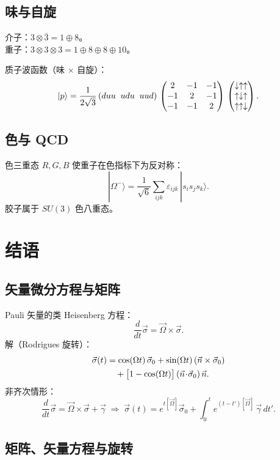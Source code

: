 \subsection{味与自旋}

介子：$3\otimes\bar{3} = 1\oplus 8$。\\
重子：$3\otimes 3\otimes 3 = 1\oplus 8\oplus 8\oplus 10$。

质子波函数（味 $\times$ 自旋）：
\[
|p\rangle = \frac{1}{2\sqrt{3}}\,
(duu\;\;udu\;\;uud)\,
\begin{pmatrix}2&-1&-1\\-1&2&-1\\-1&-1&2\end{pmatrix}\,
\begin{pmatrix}\downarrow\uparrow\uparrow \\ \uparrow\downarrow\uparrow \\ \uparrow\uparrow\downarrow\end{pmatrix}.
\]

\subsection{色与 QCD}

色三重态 $R,G,B$ 使重子在色指标下为反对称：
\[
|\Omega^{-}\rangle = \frac{1}{\sqrt{6}}\sum_{ijk}\varepsilon_{ijk}\,|s_{i}s_{j}s_{k}\rangle.
\]
胶子属于 $SU(3)$ 色八重态。

\section{结语}
\label{sec:1.6}

\subsection{矢量微分方程与矩阵}
\label{sec:1.6.1}

Pauli 矢量的类 Heisenberg 方程：
\[
\frac{d}{dt}\vec{\sigma} = \vec{\Omega}\times\vec{\sigma}.
\]
解（Rodrigues 旋转）：
\begin{align}
\vec{\sigma}(t)
&= \cos(\Omega t)\,\vec{\sigma}_{0}
 + \sin(\Omega t)\,(\vec{n}\times\vec{\sigma}_{0}) \notag \\
&\quad + \bigl[1-\cos(\Omega t)\bigr]\,(\vec{n}\!\cdot\!\vec{\sigma}_{0})\,\vec{n}.
\label{eq:rodrigues}
\end{align}
非齐次情形：
\[
\frac{d}{dt}\vec{\sigma} = \vec{\Omega}\times\vec{\sigma} + \vec{\gamma}
\;\Longrightarrow\;
\vec{\sigma}(t) = e^{t[\vec{\Omega}]}\vec{\sigma}_{0}
+ \int_{0}^{t} e^{(t-t')[\vec{\Omega}]}\,\vec{\gamma}\,dt'.
\]

\subsection{矩阵、矢量方程与旋转}
\label{sec:1.6.2}

